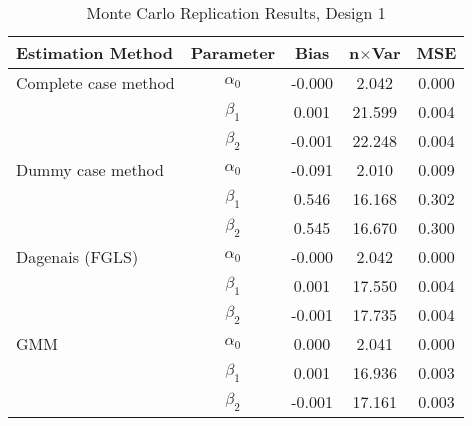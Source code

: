 \begin{table}
\centering
\caption{Monte Carlo Replication Results, Design 1}
\label{table:MCReplicationResultsDesign1}
\begin{tabular}{lcccc}
\toprule
Estimation Method & Parameter & Bias & n$\times$Var & MSE \\
\midrule
Complete case method & $\alpha_0$ & -0.000 & 2.042 & 0.000 \\
 & $\beta_1$ & 0.001 & 21.599 & 0.004 \\
 & $\beta_2$ & -0.001 & 22.248 & 0.004 \\
Dummy case method & $\alpha_0$ & -0.091 & 2.010 & 0.009 \\
 & $\beta_1$ & 0.546 & 16.168 & 0.302 \\
 & $\beta_2$ & 0.545 & 16.670 & 0.300 \\
Dagenais (FGLS) & $\alpha_0$ & -0.000 & 2.042 & 0.000 \\
 & $\beta_1$ & 0.001 & 17.550 & 0.004 \\
 & $\beta_2$ & -0.001 & 17.735 & 0.004 \\
GMM & $\alpha_0$ & 0.000 & 2.041 & 0.000 \\
 & $\beta_1$ & 0.001 & 16.936 & 0.003 \\
 & $\beta_2$ & -0.001 & 17.161 & 0.003 \\
\bottomrule
\end{tabular}
\end{table}
